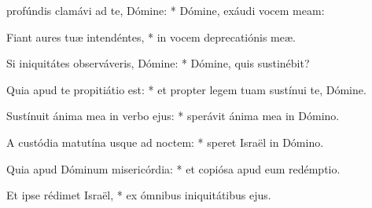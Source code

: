 \begin{psalmus}

     profúndis clamávi ad te, Dómine: * Dómine, exáudi vocem meam:

    Fiant aures tuæ intendéntes, * in vocem deprecatiónis meæ.

    Si iniquitátes observáveris, Dómine: * Dómine, quis sustinébit?

    Quia apud te propitiátio est: * et propter legem tuam sustínui te, Dómine.

    Sustínuit ánima mea in verbo ejus: * sperávit ánima mea in Dómino.

    A custódia matutína usque ad noctem: * speret Israël in Dómino.

    Quia apud Dóminum misericórdia: * et copiósa apud eum redémptio.

    Et ipse rédimet Israël, * ex ómnibus iniquitátibus ejus.

\end{psalmus}
